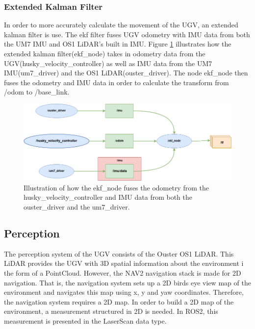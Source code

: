 \subsubsection{Extended Kalman Filter}
In order to more accurately calculate the movement of the UGV, an extended kalman filter is use. The ekf filter fuses UGV odometry with IMU data from both the UM7 IMU and OS1 LiDAR's built in IMU. Figure \ref{fig:rqt_ekf} illustrates how the extended kalman filter(ekf\_node) takes in odometry data from the UGV(husky\_velocity\_controller) as well as IMU data from the UM7 IMU(um7\_driver) and the OS1 LiDAR(ouster\_driver). The node ekf\_node then fuses the odometry and IMU data in order to calculate the transform from /odom to /base\_link.

\begin{figure}[H]
  \centering
  \includegraphics[width = 1\textwidth]{Figures/husky_nodess.drawio.png}
  \caption{Illustration of how the ekf\_node fuses the odometry from the husky\_velocity\_controller and IMU data from both the ouster\_driver and the um7\_driver.}
  \label{fig:rqt_ekf}
\end{figure}

\subsection{Perception}\label{sec:M:AN:Perception}
The perception system of the UGV consists of the Ouster OS1 LiDAR. This LiDAR provides the UGV with 3D spatial information about the environment i the form of a PointCloud. However, the NAV2 navigation stack is made for 2D navigation. That is, the navigation system sets up a 2D birds eye view map of the environment and navigates this map using x, y and yaw coordinates. Therefore, the navigation system requires a 2D map.
In order to build a 2D map of the environment, a measurement structured in 2D is needed. In ROS2, this measurement is presented in the LaserScan data type.

